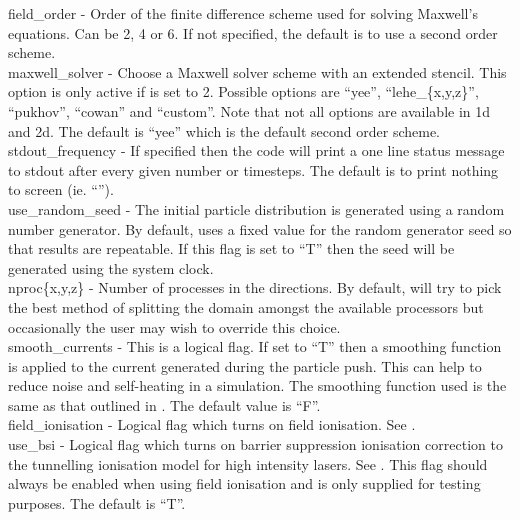 {\emphtext field\_order} - Order of the finite difference scheme used for
solving Maxwell's equations. Can be 2, 4 or 6. If not specified, the default
is to use a second order scheme.\\

{\emphtext maxwell\_solver} - Choose a Maxwell solver scheme with an extended
stencil. This option is only active if  is set to 2.
Possible options are ``yee'', ``lehe\_\{x,y,z\}'', ``pukhov'', ``cowan''
and ``custom''.
Note that
not all options are available in 1d and 2d. The default is ``yee'' which is the
default second order scheme.\\

{\emphtext stdout\_frequency} - If specified then the code will print a one
line status message to stdout after every given number or timesteps. The
default is to print nothing to screen (ie. ``'').\\

{\emphtext use\_random\_seed} - The initial particle distribution is
generated using a random number generator. By default, {\EPOCH} uses a fixed
value for the random generator seed so that results are repeatable. If this
flag is set to ``T'' then the seed will be generated using the system clock.\\

{\emphtext nproc\{x,y,z\}} - Number of processes in the 
directions. By default, {\EPOCH} will try to pick the best method of splitting
the domain amongst the available processors but occasionally the user may
wish to override this choice.\\

{\emphtext smooth\_currents} - This is a logical flag. If set to ``T'' then
a smoothing function is applied to the current generated during the particle
push. This can help to reduce noise and self-heating in a simulation. The
smoothing function used is the same as that outlined in \citet{Buneman}.
The default value is ``F''.\\

{\emphtext field\_ionisation} - Logical flag which turns on field ionisation.
  See .\\

{\emphtext use\_bsi} - Logical flag which turns on barrier suppression
  ionisation correction to the tunnelling ionisation model for high intensity
  lasers. See . This flag should always be enabled when
  using field ionisation and is only supplied for testing purposes.
  The default is ``T''.\\

